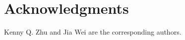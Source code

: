\documentclass[preprint,11pt]{elsarticle}
\begin{document}















 





\section*{Acknowledgments}
Kenny Q. Zhu and Jia Wei are the corresponding authors.

 

\end{document}
